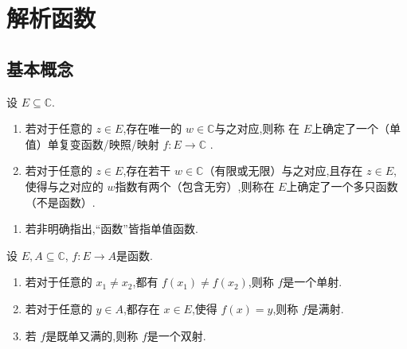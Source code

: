 \documentclass[../../复变函数.tex]{subfiles}
\begin{document}
\ifSubfilesClassLoaded{
    \frontmatter

    \tableofcontents
    
    \mainmatter
}{}

\chapter{解析函数}
    
\section{基本概念}


\begin{definition}
    设 \(  E\subseteq \mathbb{C}   \).
    \begin{enumerate}
        \item 若对于任意的 \(  z \in E  \),存在唯一的 \(  w \in \mathbb{C}   \)与之对应,则称
        在 \(E  \)上确定了一个（单值）单复变函数/映照/映射 \(  f: E\to \mathbb{C}   \) .    
        \item 若对于任意的 \(  z \in E  \),存在若干 \(  w \in \mathbb{C}   \)（有限或无限）与之对应,且存在 \(  z \in   E\),
        使得与之对应的 \(  w  \)指数有两个（包含无穷）,则称在 \(  E  \)上确定了一个多只函数（不是函数）.     
    \end{enumerate}
    
\end{definition}
\begin{remark}
    \begin{enumerate}
        \item 若非明确指出,“函数”皆指单值函数.
    \end{enumerate}
    
\end{remark}

\begin{definition}
    设 \(  E,A\subseteq \mathbb{C}   \), \(  f:E\to A  \)是函数.
    \begin{enumerate}
        \item 若对于任意的 \(  x_1\neq x_2  \),都有 \(  f\left( x_1 \right)\neq f\left( x_2 \right)    \),则称 \(  f  \)是一个单射.
        \item 若对于任意的 \(  y \in A  \),都存在 \(  x \in E  \),使得 \(  f\left( x \right)= y   \),则称 \(  f  \)是满射.   
        \item 若 \(  f  \)是既单又满的,则称 \(  f  \)是一个双射.      
    \end{enumerate}
      
\end{definition}
\end{document}
